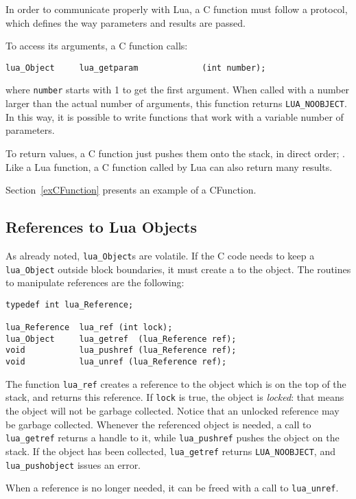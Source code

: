 In order to communicate properly with Lua,
a C function must follow a protocol,
which defines the way parameters and results are passed.

To access its arguments, a C function calls:
\begin{verbatim}
lua_Object     lua_getparam             (int number);
\end{verbatim}
where \verb'number' starts with 1 to get the first argument.
When called with a number larger than the actual number of arguments,
this function returns
\verb'LUA_NOOBJECT'.
In this way, it is possible to write functions that work with
a variable number of parameters.

To return values, a C function just pushes them onto the stack,
in direct order; .
Like a Lua function, a C function called by Lua can also return
many results.

Section~\ref{exCFunction} presents an example of a CFunction.


\subsection{References to Lua Objects}

As already noted, \verb'lua_Object's are volatile.
If the C code needs to keep a \verb'lua_Object'
outside block boundaries,
it must create a  to the object.
The routines to manipulate references are the following:
\begin{verbatim}
typedef int lua_Reference;

lua_Reference  lua_ref (int lock);
lua_Object     lua_getref  (lua_Reference ref);
void           lua_pushref (lua_Reference ref);
void           lua_unref (lua_Reference ref);
\end{verbatim}
The function \verb'lua_ref' creates a reference
to the object which is on the top of the stack,
and returns this reference.
If \verb'lock' is true, the object is {\em locked}:
that means the object will not be garbage collected.
Notice that an unlocked reference may be garbage collected.
Whenever the referenced object is needed,
a call to \verb'lua_getref'
returns a handle to it,
while \verb'lua_pushref' pushes the object on the stack.
If the object has been collected,
\verb'lua_getref' returns \verb'LUA_NOOBJECT',
and \verb'lua_pushobject' issues an error.

When a reference is no longer needed,
it can be freed with a call to \verb'lua_unref'.



